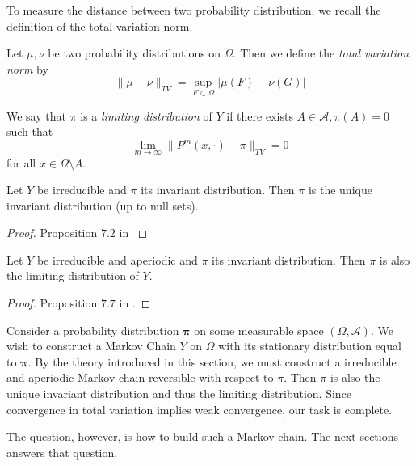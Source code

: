 To measure the distance between two probability distribution, we recall the definition of the total variation norm.
\begin{definition} 
Let $\mu,\nu$ be two probability distributions on $\Omega$. Then we define the \textit{total variation norm} by 
$$\| \mu -\nu\|_{TV} = \sup_{F \subset \Omega} |\mu(F) - \nu(G)|$$
\end{definition}


\begin{definition} We say that $\pi$ is a \textit{limiting distribution} of $Y$ if there exists $A\in\mathcal A, \pi(A)=0$ such that
$$\lim_{m\to \infty} \|P^m(x,\cdot) - \pi\|_{TV} = 0$$
for all $x \in \Omega \setminus A$.
\end{definition}



\begin{proposition} Let $Y$ be irreducible and $\pi$ its invariant distribution. Then $\pi$ is the unique invariant distribution (up to null sets).
\end{proposition}
\begin{proof}
Proposition $7.2$ in \cite{MollerWaagepetersen2003}
\end{proof}

\begin{proposition} Let $Y$ be irreducible  and aperiodic and $\pi$ its invariant distribution. Then $\pi$ is also the limiting distribution of $Y$. 
\end{proposition}
\begin{proof}
Proposition $7.7$ in \cite{MollerWaagepetersen2003}.
\end{proof}



Consider a probability distribution $\mathbf \pi$ on some measurable space $(\Omega,\mathcal A)$. We wish to construct a Markov Chain $Y$ on $\Omega$ with its stationary distribution equal to $\mathbf \pi$. By the theory introduced in this section, we must construct a irreducible and aperiodic Markov chain reversible with respect to $\pi$. Then $\pi$ is also the unique invariant distribution and thus the limiting distribution. Since convergence in total variation implies weak convergence, our task is complete.

The question, however, is how to build such a Markov chain. The next sections answers that question. 



